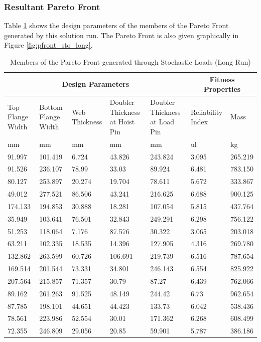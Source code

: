 \subsubsection{Resultant Pareto Front}
Table \ref{tab:pfront_sto_long} shows the design parameters of the members of the Pareto Front generated by this solution run. The Pareto Front is also given graphically in Figure \ref{fig:pfront_sto_long}. 
\begin{table}[!htbp]
	\caption{Members of the Pareto Front generated through Stochastic Loads (Long Run)}
\label{tab:pfront_sto_long}
\centering
\small
\begin{tabular}{|p{1.5cm}p{1.5cm}p{1.4cm}p{2cm}p{2cm}||p{1.5cm}p{1.5cm}|}
\hline
\multicolumn{5}{|c||}{Design Parameters}&\multicolumn{2}{|c|}{Fitness Properties}\\
\hline
Top Flange Width&Bottom Flange Width&Web Thickness&Doubler Thickness at Hoist Pin&Doubler Thickness at Load Pin&Reliability Index& Mass\\
\hline
mm&mm&mm&mm&mm&ul&kg\\
\hline
91.997&101.419&6.724&43.826&243.824&3.095&265.219\\
91.526&236.107&78.99&33.03&89.924&6.481&783.150\\
80.127&253.897&20.274&19.704&78.611&5.672&333.867\\
49.012&277.521&86.506&43.241&216.625&6.688&900.125\\
174.133&194.853&30.888&18.281&107.054&5.815&437.764\\
35.949&103.641&76.501&32.843&249.291&6.298&756.122\\
51.253&118.064&7.176&87.576&30.322&3.065&203.018\\
63.211&102.335&18.535&14.396&127.905&4.316&269.780\\
132.862&263.599&60.726&106.691&219.739&6.516&787.654\\
169.514&201.544&73.331&34.801&246.143&6.554&825.922\\
207.564&215.857&71.357&30.79&87.27&6.439&762.066\\
89.162&261.263&91.525&48.149&244.42&6.73&962.654\\
87.785&198.101&44.651&44.423&133.73&6.042&538.436\\
78.561&223.986&52.554&30.01&171.362&6.268&608.499\\
72.355&246.809&29.056&20.85&59.901&5.787&386.186\\
\hline
\end{tabular}
\end{table}

